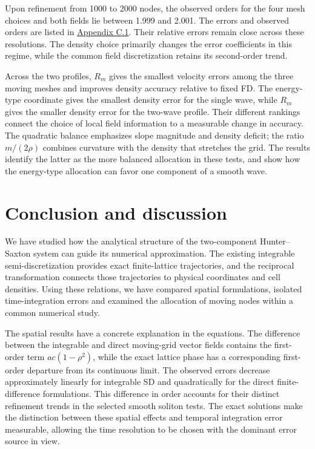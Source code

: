 \documentclass{article}
\begin{document}
Upon refinement from 1000 to 2000 nodes, the observed orders for the four mesh choices and both fields lie between 1.999 and 2.001. The errors and observed orders are listed in \hyperref[app:refinement]{Appendix C.1}. Their relative errors remain close across these resolutions. The density choice primarily changes the error coefficients in this regime, while the common field discretization retains its second-order trend.

Across the two profiles, \(R_m\) gives the smallest velocity errors among the three moving meshes and improves density accuracy relative to fixed FD. The energy-type coordinate gives the smallest density error for the single wave, while \(R_m\) gives the smaller density error for the two-wave profile. Their different rankings connect the choice of local field information to a measurable change in accuracy. The quadratic balance emphasizes slope magnitude and density deficit; the ratio \(m/(2\rho)\) combines curvature with the density that stretches the grid. The results identify the latter as the more balanced allocation in these tests, and show how the energy-type allocation can favor one component of a smooth wave.


\section{Conclusion and discussion}

We have studied how the analytical structure of the two-component Hunter–Saxton system can guide its numerical approximation. The existing integrable semi-discretization provides exact finite-lattice trajectories, and the reciprocal transformation connects those trajectories to physical coordinates and cell densities. Using these relations, we have compared spatial formulations, isolated time-integration errors and examined the allocation of moving nodes within a common numerical study.

The spatial results have a concrete explanation in the equations. The difference between the integrable and direct moving-grid vector fields contains the first-order term \(ac(1-\rho^2)\), while the exact lattice phase has a corresponding first-order departure from its continuous limit. The observed errors decrease approximately linearly for integrable SD and quadratically for the direct finite-difference formulations. This difference in order accounts for their distinct refinement trends in the selected smooth soliton tests. The exact solutions make the distinction between these spatial effects and temporal integration error measurable, allowing the time resolution to be chosen with the dominant error source in view.
\end{document}
